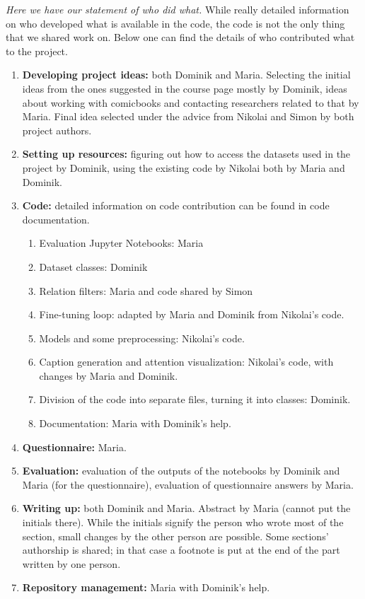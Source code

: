 \documentclass[11pt]{article}
\begin{document}
\textit{Here we have our statement of who did what.}
While really detailed information on who developed what is available in the code, the code is not the only thing that we shared work on. Below one can find the details of who contributed what to the project.
\begin{enumerate}
    \item \textbf{Developing project ideas:} both Dominik and Maria. Selecting the initial ideas from the ones suggested in the course page mostly by Dominik, ideas about working with comicbooks and contacting researchers related to that by Maria. Final idea selected under the advice from Nikolai and Simon by both project authors.
    \item \textbf{Setting up resources:} figuring out how to access the datasets used in the project by Dominik, using the existing code by Nikolai both by Maria and Dominik.
    \item \textbf{Code:} detailed information on code contribution can be found in code documentation.
          \begin{enumerate}
              \item Evaluation Jupyter Notebooks: Maria
              \item Dataset classes: Dominik
              \item Relation filters: Maria and code shared by Simon
              \item Fine-tuning loop: adapted by Maria and Dominik from Nikolai's code.
              \item Models and some preprocessing: Nikolai's code.
              \item Caption generation and attention visualization: Nikolai's code, with changes by Maria and Dominik.
              \item Division of the code into separate files, turning it into classes: Dominik.
              \item Documentation: Maria with Dominik's help.
          \end{enumerate}
    \item \textbf{Questionnaire:} Maria.
    \item \textbf{Evaluation:} evaluation of the outputs of the notebooks by Dominik and Maria (for the questionnaire), evaluation of questionnaire answers by Maria.
    \item \textbf{Writing up:} both Dominik and Maria. Abstract by Maria (cannot put the initials there). While the initials signify the person who wrote most of the section, small changes by the other person are possible. Some sections' authorship is shared; in that case a footnote is put at the end of the part written by one person.
    \item \textbf{Repository management:} Maria with Dominik's help.
\end{enumerate}
\end{document}
